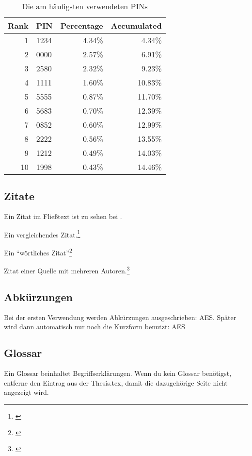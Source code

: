 \begin{table}[hbt]
\centering
\begin{minipage}[t]{.5\textwidth} %
\caption{Die am häufigsten verwendeten PINs} %
\begin{tabularx}{\columnwidth}{rXrr}
\toprule
Rank & PIN & Percentage & Accumulated \\
\midrule
1 & 1234 & 4.34\% & 4.34\%\\
2 & 0000 & 2.57\% & 6.91\%\\
3 & 2580 & 2.32\% & 9.23\%\\
4 & 1111 & 1.60\% & 10.83\%\\
5 & 5555 & 0.87\% & 11.70\%\\
6 & 5683 & 0.70\% & 12.39\%\\
7 & 0852 & 0.60\% & 12.99\%\\
8 & 2222 & 0.56\% & 13.55\%\\
9 & 1212 & 0.49\% & 14.03\%\\
10 & 1998 & 0.43\% & 14.46\%\\
\bottomrule
\end{tabularx}
\label{tab:pin}
\end{minipage}
\end{table}

\subsection{Zitate}

Ein Zitat im Fließtext ist zu sehen bei \citet{Fuller2011}.

Ein vergleichendes Zitat.\footnote{\cite[vgl.][5\psqq]{Maslennikov2011}}

Ein \enquote{wörtliches Zitat}\footnote{\cite[13\psq]{Meier2010}}

Zitat einer Quelle mit mehreren Autoren.\footnote{\cite[vgl.][32\psqq]{Hocking2011a}}


\subsection{Abkürzungen}
Bei der ersten Verwendung werden Abkürzungen ausgeschrieben: \gls{AES}.
Später wird dann automatisch nur noch die Kurzform benutzt: \gls{AES}

\subsection{Glossar}
Ein \gls{Glossar} beinhaltet Begriffserklärungen. 
Wenn du kein Glossar benötigst, entferne den Eintrag aus der Thesis.tex, damit die dazugehörige Seite nicht angezeigt wird.

